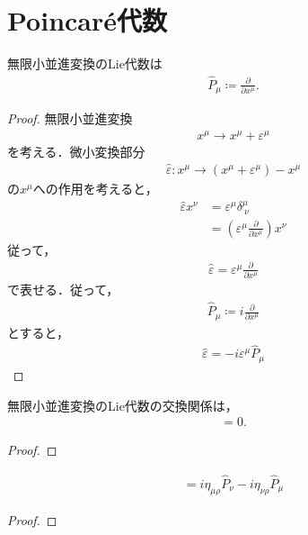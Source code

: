 \section{Poincar\'{e}代数}
\begin{prop}
	無限小並進変換のLie代数は
	\begin{align}
		\hat{P}_{\mu}\coloneqq{}\frac{\partial}{\partial{}x^{\mu}}.
	\end{align}
\end{prop}
\begin{proof}
	無限小並進変換
	\begin{align}
		x^{\mu}\longrightarrow{}x^{\mu}+\varepsilon^{\mu}
	\end{align}
	を考える．微小変換部分
	\begin{align}
		\hat{\varepsilon}:x^{\mu}\longrightarrow{}(x^{\mu}+\varepsilon^{\mu})-x^{\mu}
	\end{align}
	の\(x^{\mu}\)への作用を考えると，
	\begin{align}
		\hat{\varepsilon}x^{\nu} & =\varepsilon^{\mu}\delta^{\mu}_{\ \nu}                                   \\
		                         & =\left(\varepsilon^{\mu}\frac{\partial}{\partial{}x^{\mu}}\right)x^{\nu}
	\end{align}
	従って，
	\begin{align}
		\hat{\varepsilon}=\varepsilon^{\mu}\frac{\partial}{\partial{}x^{\mu}}
	\end{align}
	で表せる．従って，
	\begin{align}
		\hat{P}_{\mu}\coloneqq{}i\frac{\partial}{\partial{}x^{\mu}}
	\end{align}
	とすると，
	\begin{align}
		\hat{\varepsilon}=-i\varepsilon^{\mu}\hat{P}_{\mu}
	\end{align}
\end{proof}
\begin{prop}
	無限小並進変換のLie代数の交換関係は，
	\begin{align}
		[\hat{P}_{\mu},\hat{P}_{\nu}]=0.
	\end{align}
\end{prop}
\begin{proof}

\end{proof}
\begin{prop}
	\begin{align}
		[\hat{M}_{\mu\nu},\hat{P}_{\rho}]=i\eta_{\mu\rho}\hat{P}_{\nu}-i\eta_{\nu\rho}\hat{P}_{\mu}
	\end{align}
\end{prop}
\begin{proof}

\end{proof}
